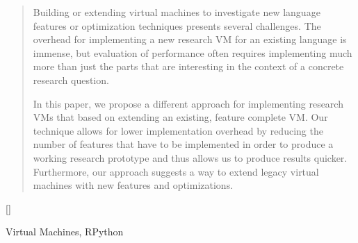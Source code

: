 \documentclass[preprint, nonatbib]{sigplanconf}
\begin{document}
\begin{abstract}
  Building or extending virtual machines to investigate new language features or optimization techniques presents several challenges. The overhead for implementing a new research VM for an existing language is immense, but evaluation of performance often requires implementing much more than just the parts that are interesting in the context of a concrete research question.

  In this paper, we propose a different approach for implementing research VMs that based on extending an existing, feature complete VM. Our technique allows for lower implementation overhead by reducing the number of features that have to be implemented in order to produce a working research prototype and thus allows us to produce results quicker. Furthermore, our approach suggests a way to extend legacy virtual machines with new features and optimizations.
\end{abstract}

[]

\keywords
Virtual Machines, RPython
\end{document}
